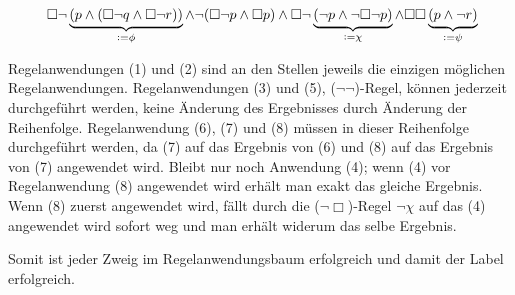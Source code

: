 \[\ \Box \neg \underbrace{(p \wedge (\Box\neg q \wedge \Box\neg r))}_{\defeq
	\phi}
	\wedge \neg (\Box\neg p \wedge \Box p)
	\wedge \Box \neg \underbrace{(\neg p \wedge \neg\Box\neg p)}_{\defeq \chi}
\wedge \Box\Box \underbrace{(p \wedge \neg r)}_{\defeq \psi} \]


\begin{prooftree}









\end{prooftree}

Regelanwendungen (1) und (2) sind an den Stellen jeweils die einzigen möglichen
Regelanwendungen. Regelanwendungen (3) und (5), ($\neg\neg$)-Regel, können
jederzeit durchgeführt werden, keine Änderung des Ergebnisses durch Änderung
der Reihenfolge. Regelanwendung (6), (7) und (8) müssen in dieser Reihenfolge
durchgeführt werden, da (7) auf das Ergebnis von (6) und (8) auf das Ergebnis
von (7) angewendet wird. Bleibt nur noch Anwendung (4); wenn (4) vor
Regelanwendung (8) angewendet wird erhält man exakt das gleiche Ergebnis. Wenn
(8) zuerst angewendet wird, fällt durch die ($\neg\Box$)-Regel $\neg\chi$ auf
das (4) angewendet wird sofort weg und man erhält widerum das selbe Ergebnis.

Somit ist jeder Zweig im Regelanwendungsbaum erfolgreich und damit der Label erfolgreich.

